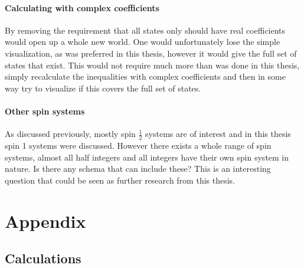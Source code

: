 \documentclass[
  utf8,%
  parskip,%
  largesmallcaps,intlimits,widermath,%
  sharecounter,nobreak,definition=marks,%
  noparts%
]{rtthesis}
\begin{document}
\subsection{Calculating with complex coefficients}
By removing the requirement that all states only should have real coefficients would open up a whole new world. One would unfortunately lose the simple visualization, as was preferred in this thesis, however it would give the full set of states that exist. This would not require much more than was done in this thesis, simply recalculate the inequalities with complex coefficients and then in some way try to visualize if this covers the full set of states. 
\subsection{Other spin systems}
As discussed previously, mostly spin $\frac{1}{2}$ systems are of interest and in this thesis spin 1 systems were discussed. However there exists a whole range of spin systems, almost all half integers and all integers have their own spin system in nature. Is there any schema that can include these? This is an interesting question that could be seen as further research from this thesis.

\part*{Appendix}
\appendix
\chapter{Calculations}\label{cha:Calculations}
\end{document}
